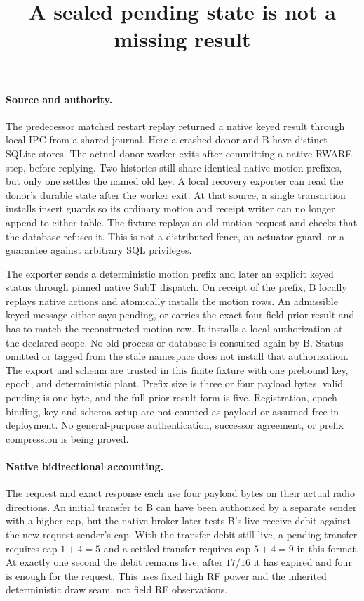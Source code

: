 \documentclass{article}
\title{A sealed pending state is not a missing result}
\author{}
\date{}
\begin{document}
\maketitle
\paragraph{Source and authority.}
The predecessor \href{https://github.com/eternal-november/eos-research-programmes/pull/813}{matched restart replay}
returned a native keyed result through local IPC from a shared
journal. Here a crashed donor and B have distinct SQLite stores.
The actual donor worker exits after committing a native RWARE step,
before replying. Two histories still share identical native motion
prefixes, but only one settles the named old key.
A local recovery exporter can read the donor's durable state after
the worker exit. At that source, a single transaction installs
insert guards so its ordinary motion and receipt writer can no
longer append to either table. The fixture replays an old
motion request and checks that the database refuses it. This is
not a distributed fence, an actuator guard, or a guarantee against
arbitrary SQL privileges.

The exporter sends a deterministic motion prefix and later an
explicit keyed status through pinned native SubT dispatch. On
receipt of the prefix, B locally replays native actions and
atomically installs the motion rows. An admissible keyed message
either says pending, or carries the exact four-field prior result
and has to match the reconstructed motion row. It installs a
local authorization at the declared scope. No old process or
database is consulted again by B. Status omitted or tagged from
the stale namespace does not install that authorization. The
export and schema are trusted in this finite fixture with one
prebound key, epoch, and deterministic plant. Prefix size is
three or four payload bytes, valid pending is one byte, and the
full prior-result form is five. Registration, epoch binding,
key and schema setup are not counted as payload or assumed
free in deployment. No general-purpose authentication,
successor agreement, or prefix compression is being proved.

\paragraph{Native bidirectional accounting.}
The request and exact response each use four payload bytes on
their actual radio directions. An initial transfer to B can
have been authorized by a separate sender with a higher cap,
but the native broker later tests B's live receive debit
against the new request sender's cap. With the transfer debit
still live, a pending transfer requires cap $1+4=5$ and a
settled transfer requires cap $5+4=9$ in this format.
At exactly one second the debit remains live; after $17/16$ it
has expired and four is enough for the request. This uses fixed
high RF power and the inherited deterministic draw seam, not
field RF observations.
\end{document}
